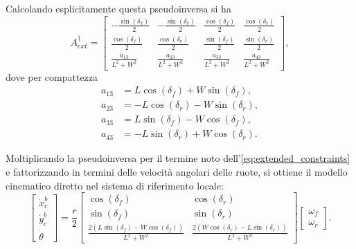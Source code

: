 Calcolando esplicitamente questa pseudoinversa si ha
\begin{equation}\label{eq:Aext_pinv}
    A_{ext}^\dagger = \begin{bmatrix}
        -\frac{\sin(\delta_f)}{2} & -\frac{\sin(\delta_r)}{2} & \frac{\cos(\delta_f)}{2} & \frac{\cos(\delta_r)}{2} \\
        \frac{\cos(\delta_f)}{2}  & \frac{\cos(\delta_r)}{2}  & \frac{\sin(\delta_f)}{2} & \frac{\sin(\delta_r)}{2} \\
        \frac{a_{13}}{L^2 + W^2}  & \frac{a_{23}}{L^2 + W^2}  & \frac{a_{33}}{L^2 + W^2} & \frac{a_{43}}{L^2 + W^2}
    \end{bmatrix},
\end{equation}
dove per compattezza
\begin{align}
    a_{13} & =L\cos(\delta_f)+W\sin(\delta_f), \label{eq:a13}                 \\
    a_{23} & = -L\cos(\delta_r)-W\sin(\delta_r), \label{eq:a23}               \\
    a_{33} & = L\sin(\delta_f) - W\cos(\delta_f), \label{eq:a33}              \\
    a_{43} & = -L\sin(\delta_r) + W\cos(\delta_r).             \label{eq:a43}
\end{align}

Moltiplicando la pseudoinversa per il termine noto dell'\cref{eq:extended_constraints} e fattorizzando in termini delle velocità angolari delle ruote, si ottiene il modello cinematico diretto nel sistema di riferimento locale:
\begin{equation}\label{eq:forward_kinematics_body}
    \begin{bmatrix}
        \dot{x}_c^b \\
        \dot{y}_c^b \\
        \dot{\theta}
    \end{bmatrix} = \frac{r}{2} \begin{bmatrix}
        \cos(\delta_f)                                         & \cos(\delta_r)                                       \\
        \sin(\delta_f)                                         & \sin(\delta_r)                                       \\
        \frac{2(L\sin(\delta_f) - W\cos(\delta_f))}{L^2 + W^2} & \frac{2(W\cos(\delta_r)-L\sin(\delta_r))}{L^2 + W^2}
    \end{bmatrix} \begin{bmatrix}
        \omega_f \\
        \omega_r
    \end{bmatrix}.
\end{equation}

